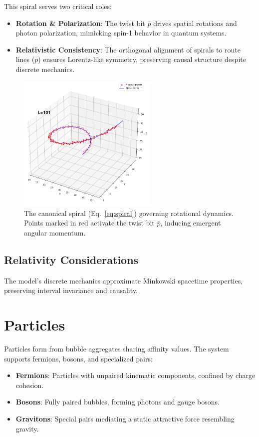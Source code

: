 \documentclass[12pt]{article}
\begin{document}
This spiral serves two critical roles:
\begin{itemize}
    \item \textbf{Rotation \& Polarization}: The twist bit \( \bar{p }\) drives spatial rotations and photon polarization, mimicking spin-1 behavior in quantum systems.
    \item \textbf{Relativistic Consistency}: The orthogonal alignment of spirals to route lines (\( p \)) ensures Lorentz-like symmetry, preserving causal structure despite discrete mechanics.
\end{itemize}

\begin{figure}[htbp]
    \centering
    \includegraphics[width=0.6\textwidth]{fig3}
    \caption{The canonical spiral (Eq.~\ref{eq:spiral}) governing rotational dynamics. Points marked in red activate the twist bit \( \bar{p} \), inducing emergent angular momentum.}
    \label{fig:spiral}
\end{figure}


\subsection{Relativity Considerations}
The model's discrete mechanics approximate Minkowski spacetime properties, preserving interval invariance and causality.

\section{Particles}
Particles form from bubble aggregates sharing affinity values. The system supports fermions, bosons, and specialized pairs:
\begin{itemize}
    \item \textbf{Fermions}: Particles with unpaired kinematic components, confined by charge cohesion.
    \item \textbf{Bosons}: Fully paired bubbles, forming photons and gauge bosons.
    \item \textbf{Gravitons}: Special pairs mediating a static attractive force resembling gravity.
\end{itemize}
\end{document}
